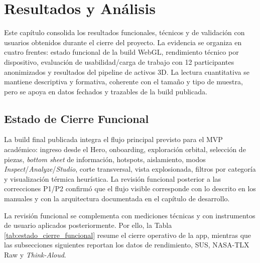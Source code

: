 
\section{Resultados y Análisis}

Este capítulo consolida los resultados funcionales, técnicos y de validación con usuarios obtenidos durante el cierre del proyecto. La evidencia se organiza en cuatro frentes: estado funcional de la build WebGL, rendimiento técnico por dispositivo, evaluación de usabilidad/carga de trabajo con 12 participantes anonimizados y resultados del pipeline de activos 3D. La lectura cuantitativa se mantiene descriptiva y formativa, coherente con el tamaño y tipo de muestra, pero se apoya en datos fechados y trazables de la build publicada.

\subsection{Estado de Cierre Funcional}

La build final publicada integra el flujo principal previsto para el MVP académico: ingreso desde el Hero, onboarding, exploración orbital, selección de piezas, \textit{bottom sheet} de información, hotspots, aislamiento, modos \textit{Inspect}/\textit{Analyze}/\textit{Studio}, corte transversal, vista explosionada, filtros por categoría y visualización térmica heurística. La revisión funcional posterior a las correcciones P1/P2 confirmó que el flujo visible corresponde con lo descrito en los manuales y con la arquitectura documentada en el capítulo de desarrollo.

La revisión funcional se complementa con mediciones técnicas y con instrumentos de usuario aplicados posteriormente. Por ello, la Tabla \ref{tab:estado_cierre_funcional} resume el cierre operativo de la app, mientras que las subsecciones siguientes reportan los datos de rendimiento, SUS, NASA-TLX Raw y \textit{Think-Aloud}.

